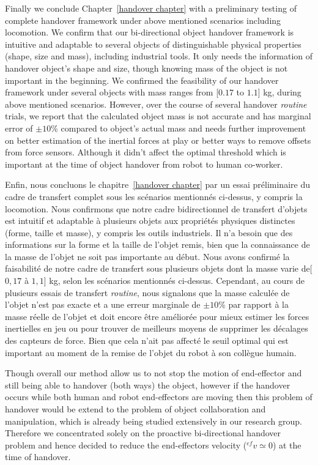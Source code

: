 Finally we conclude Chapter~\ref{handover chapter} with a preliminary testing of complete handover framework under above mentioned scenarios including locomotion. We confirm that our bi-directional object handover framework is intuitive and adaptable to several objects of distinguishable physical properties (shape, size and mass), including  industrial tools. It only needs the information of handover object's shape and size, though knowing mass of the object is not important in the beginning. We confirmed the feasibility of our handover framework under several objects with mass ranges from [$0.17$ to $1.1$] kg, during above mentioned scenarios. However, over the course of several handover \textit{routine} trials, we report that the calculated object mass is not accurate and has marginal error of $ \pm10 $\% compared to object's actual mass and needs further improvement on better estimation of the inertial forces at play or  better ways to remove offsets from force sensors. Although it didn't affect the optimal threshold which is important at the time of object handover from robot to human co-worker.

Enfin, nous concluons le chapitre~\ref{handover chapter} par un essai préliminaire du cadre de transfert complet sous les scénarios mentionnés ci-dessus, y compris la locomotion. Nous confirmons que notre cadre bidirectionnel de transfert d'objets est intuitif et adaptable à plusieurs objets aux propriétés physiques distinctes (forme, taille et masse), y compris les outils industriels. Il n'a besoin que des informations sur la forme et la taille de l'objet remis, bien que la connaissance de la masse de l'objet ne soit pas importante au début. Nous avons confirmé la faisabilité de notre cadre de transfert sous plusieurs objets dont la masse varie de[$0,17 $ à $ 1,1 $] kg, selon les scénarios mentionnés ci-dessus. Cependant, au cours de plusieurs essais de transfert \textit{routine}, nous signalons que la masse calculée de l'objet n'est pas exacte et a une erreur marginale de $ \pm10 $\% par rapport à la masse réelle de l'objet et doit encore être améliorée pour mieux estimer les forces inertielles en jeu ou pour trouver de meilleurs moyens de supprimer les décalages des capteurs de force. Bien que cela n'ait pas affecté le seuil optimal qui est important au moment de la remise de l'objet du robot à son collègue humain.



Though overall our method allow us to not stop the motion of end-effector and still being able to handover (both ways) the object, however if the handover occurs while both human and robot end-effectors are moving then this problem of handover would be extend to the problem of object collaboration and manipulation, which is already being studied extensively in our research group. Therefore we concentrated solely on the proactive bi-directional handover problem and hence decided to reduce the end-effectors velocity (${}^{ef}v\simeq0$) at the time of handover. 

